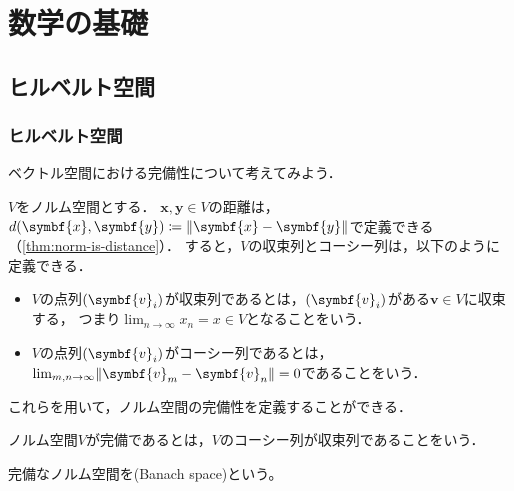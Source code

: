 \documentclass{sotsu}
\begin{document}
\tableofcontents


\chapter{数学の基礎}













\section{ヒルベルト空間}

\subsection{ヒルベルト空間}

ベクトル空間における完備性について考えてみよう．

$V$をノルム空間とする．
$\symbf{x}, \symbf{y} \in V$の距離は，
$d(\symbf{x}, \symbf{y}) \coloneq \norm{\symbf{x} - \symbf{y}}$で定義できる（\cref{thm:norm-is-distance}）．
すると，$V$の収束列とコーシー列は，以下のように定義できる．
\begin{itemize}
    \item $V$の点列$\sequ{\symbf{v}_i}$が収束列であるとは，$\sequ{\symbf{v}_i}$がある$\symbf{v} \in V$に収束する，
        つまり$\lim_{n \to \infty} x_n = x \in V$となることをいう．
    \item $V$の点列$\sequ{\symbf{v}_i}$がコーシー列であるとは，
        $\lim_{m, n \to \infty} \norm{\symbf{v}_m - \symbf{v}_n} = 0$であることをいう．
\end{itemize}
これらを用いて，ノルム空間の完備性を定義することができる．

\begin{definition}
    ノルム空間$V$が完備であるとは，$V$のコーシー列が収束列であることをいう．
\end{definition}

\begin{definition}[バナッハ空間]
    \label{dfn:Banach-space}
    完備なノルム空間を(Banach space)という。
\end{definition}
\end{document}
